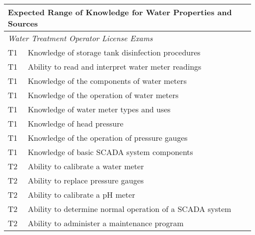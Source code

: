 \begin{table}[H]
\begin{tabular}{| m{1cm} |m{15cm} |}
\hline
\multicolumn{2}{|l|}{\textbf{Expected   Range of Knowledge for Water Properties and Sources}}                                                                      \\ \hline
\multicolumn{2}{|l|}{\textit{Water Treatment Operator License Exams}}                                                                  \\ \hline
T1 & Knowledge of storage   tank disinfection procedures                                                            \\ \hline
T1 & Ability to read and   interpret water meter readings                                                           \\ \hline
T1 & Knowledge of the   components of water meters                                                                  \\ \hline
T1 & Knowledge of the   operation of water meters                                                                   \\ \hline
T1 & Knowledge of water   meter types and uses                                                                      \\ \hline
T1 & Knowledge of head   pressure                                                                                   \\ \hline
T1 & Knowledge of the   operation of pressure gauges                                                                \\ \hline
T1 & Knowledge of basic   SCADA system components                                                                   \\ \hline
T2 & Ability to calibrate   a water meter                                                                           \\ \hline
T2 & Ability to replace   pressure gauges                                                                           \\ \hline
T2 & Ability to calibrate   a pH meter                                                                              \\ \hline
T2 & Ability to determine   normal operation of a SCADA system                                                      \\ \hline
T2 & Ability to administer   a maintenance program                                                                  \\ \hline

\end{tabular}
\end{table}
